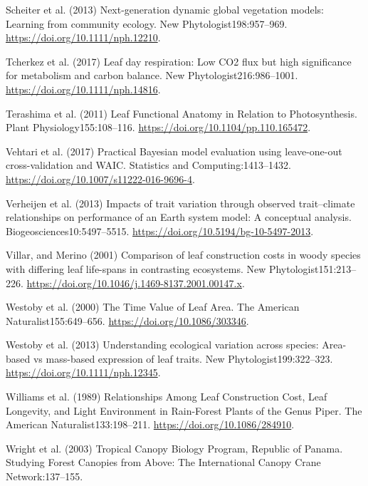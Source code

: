 \documentclass[
  12pt,
  letterpaper,
  DIV=11,
  numbers=noendperiod]{scrartcl}
\newlength{\cslhangindent}
\newenvironment{CSLReferences}[2] %
 {\begin{list}{}{%
  \setlength{\itemindent}{0pt}
  \setlength{\leftmargin}{0pt}
  \setlength{\parsep}{0pt}
  \ifodd #1
   \setlength{\leftmargin}{\cslhangindent}
   \setlength{\itemindent}{-1\cslhangindent}
  \fi
  \setlength{\itemsep}{#2\baselineskip}}}
 {\end{list}}
\begin{document}
\begin{CSLReferences}{1}{1}
Scheiter et al. (2013) Next-generation dynamic global vegetation models:
{Learning} from community ecology. New Phytologist198:957--969.
\url{https://doi.org/10.1111/nph.12210}.

Tcherkez et al. (2017) Leaf day respiration: Low {CO2} flux but high
significance for metabolism and carbon balance. New
Phytologist216:986--1001. \url{https://doi.org/10.1111/nph.14816}.

Terashima et al. (2011) Leaf {Functional Anatomy} in {Relation} to
{Photosynthesis}. Plant Physiology155:108--116.
\url{https://doi.org/10.1104/pp.110.165472}.

Vehtari et al. (2017) Practical {Bayesian} model evaluation using
leave-one-out cross-validation and {WAIC}. Statistics and
Computing:1413--1432. \url{https://doi.org/10.1007/s11222-016-9696-4}.

Verheijen et al. (2013) Impacts of trait variation through observed
trait--climate relationships on performance of an {Earth} system model:
A conceptual analysis. Biogeosciences10:5497--5515.
\url{https://doi.org/10.5194/bg-10-5497-2013}.

Villar, and Merino (2001) Comparison of leaf construction costs in woody
species with differing leaf life-spans in contrasting ecosystems. New
Phytologist151:213--226.
\url{https://doi.org/10.1046/j.1469-8137.2001.00147.x}.

Westoby et al. (2000) The {Time Value} of {Leaf Area}. The American
Naturalist155:649--656. \url{https://doi.org/10.1086/303346}.

Westoby et al. (2013) Understanding ecological variation across species:
{Area-based} vs mass-based expression of leaf traits. New
Phytologist199:322--323. \url{https://doi.org/10.1111/nph.12345}.

Williams et al. (1989) Relationships {Among Leaf Construction Cost},
{Leaf Longevity}, and {Light Environment} in {Rain-Forest Plants} of the
{Genus Piper}. The American Naturalist133:198--211.
\url{https://doi.org/10.1086/284910}.

Wright et al. (2003) Tropical {Canopy Biology Program}, {Republic} of
{Panama}. Studying {Forest Canopies} from {Above}: {The International
Canopy Crane Network}:137--155.


\end{CSLReferences}
\end{document}
